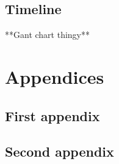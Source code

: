 \subsection{Timeline}
**Gant chart thingy**



\newpage


\newpage

\appendix
\section*{Appendices}
\renewcommand{\thesubsection}{\Alph{subsection}}
\subsection{First appendix}
\subsection{Second appendix}


